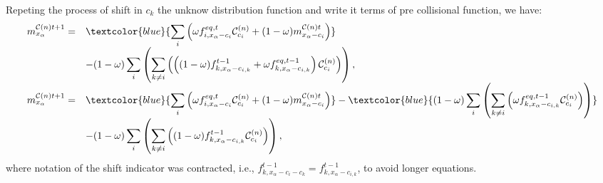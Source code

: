 \documentclass[letterpaper,10pt,english,openany,oneside]{jupyterBook}
\begin{document}
\sphinxAtStartPar
Repeting the process of shift in \(c_{k}\) the unknow distribution function and write it terms of pre collisional function, we have:
\begin{equation}\label{equation:Refs/LBM-Study/FDM-Belloti/General-FDM-Single-Relaxation:SRT-FDM-Exp-Step1-n}
\begin{split}
\begin{array}{rl}
m_{x_{\alpha}}^{\mathcal{C}(n)t+1} = & \textcolor{blue}{\displaystyle\sum_{i}\left(\omega f_{i,x_{\alpha}-c_{i}}^{eq,t}\mathcal{C}_{c_{i}}^{(n)} + (1-\omega)m_{x_{\alpha}-c_{i}}^{\mathcal{C}(n)t} \right)} \\
&- (1-\omega) \displaystyle\sum_{i}\left( \sum_{k\neq i} \left(\left( (1-\omega)f_{k,x_{\alpha}-c_{i,k}}^{t-1}  + \omega f_{k,x_{\alpha}-c_{i,k}}^{eq,t-1} \right)\mathcal{C}_{c_{i}}^{(n)}  \right) \right), \\
m_{x_{\alpha}}^{\mathcal{C}(n)t+1} = & \textcolor{blue}{\displaystyle\sum_{i}\left(\omega f_{i,x_{\alpha}-c_{i}}^{eq,t}\mathcal{C}_{c_{i}}^{(n)} + (1-\omega)m_{x_{\alpha}-c_{i}}^{\mathcal{C}(n)t} \right)} - \textcolor{blue}{(1-\omega) \displaystyle\sum_{i}\left( \sum_{k\neq i} \left( \omega f_{k,x_{\alpha}-c_{i,k}}^{eq,t-1} \mathcal{C}_{c_{i}}^{(n)}  \right) \right)} \\
&- (1-\omega) \displaystyle\sum_{i}\left( \sum_{k\neq i} \left( (1-\omega)f_{k,x_{\alpha}-c_{i,k}}^{t-1} \mathcal{C}_{c_{i}}^{(n)}  \right) \right),
\end{array}
\end{split}
\end{equation}
\sphinxAtStartPar
where notation of the shift indicator was contracted, i.e., \(f_{k,x_{\alpha}-c_{i}-c_{k}}^{t-1}=f_{k,x_{\alpha}-c_{i,k}}^{t-1}\), to avoid longer equations.
\end{document}
